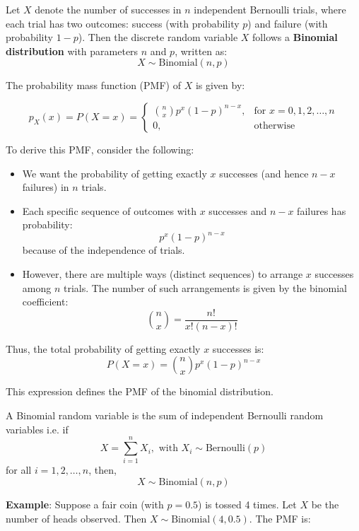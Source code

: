 \documentclass[twoside]{book}
\begin{document}
Let $X$ denote the number of successes in $n$ independent Bernoulli trials, where each trial has two outcomes: {success} (with probability $p$) and {failure} (with probability $1 - p$).
Then the discrete random variable $X$ follows a \textbf{Binomial distribution} with parameters $n$ and $p$, written as:
\[
X \sim \text{Binomial}(n, p)
\]

The probability mass function (PMF) of $X$ is given by:
\begin{textbox}
\[
p_X(x) = P(X = x) = 
\begin{cases}
\binom{n}{x} p^x (1 - p)^{n - x}, & \text{for } x = 0, 1, 2, \ldots, n \\
0, & \text{otherwise}
\end{cases}
\]

\end{textbox}

To derive this PMF, consider the following:

\begin{itemize}
    \item We want the probability of getting exactly $x$ successes (and hence $n - x$ failures) in $n$ trials.
    \item Each specific sequence of outcomes with $x$ successes and $n - x$ failures has probability:
    \[
    p^x (1 - p)^{n - x}
    \]
    because of the independence of trials.
    \item However, there are multiple ways (distinct sequences) to arrange $x$ successes among $n$ trials. The number of such arrangements is given by the binomial coefficient:
    \[
    \binom{n}{x} = \frac{n!}{x!(n - x)!}
    \]
\end{itemize}

Thus, the total probability of getting exactly $x$ successes is:
\[
P(X = x) = \binom{n}{x} p^x (1 - p)^{n - x}
\]

This expression defines the PMF of the binomial distribution.

\begin{textbox}
    A Binomial random variable is the sum of independent Bernoulli random variables i.e. if $$X=\sum_{i=1}^{n} X_i, \text{ with } X_i\sim \text{Bernoulli}(p)$$ for all $i = 1,2,\dots, n$,
    then, $$X\sim \text{Binomial}(n, p)$$
\end{textbox}

\vspace{2mm}

\textbf{Example}: Suppose a fair coin (with $p = 0.5$) is tossed 4 times. Let $X$ be the number of heads observed. Then $X \sim \text{Binomial}(4, 0.5)$. The PMF is:
\end{document}
